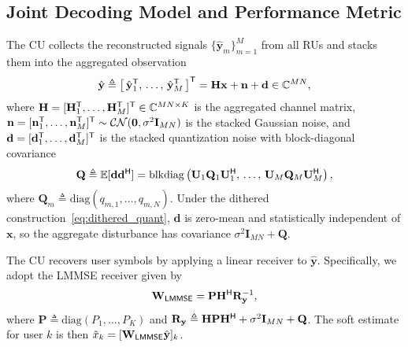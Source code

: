 \documentclass[10pt, twocolumn, comsoc]{IEEEtran}
\begin{document}
\subsection{Joint Decoding Model and Performance Metric}\label{subsec:joint_decoding}
The CU collects the reconstructed signals $\{\hat{\mathbf{y}}_m\}_{m=1}^{M}$ from all RUs and stacks them into the aggregated observation
\begin{align} \label{eq:vmac}
  \hat{\mathbf{y}} 
  \triangleq \big[\, \hat{\mathbf{y}}_1^{\sf T},\, 
       \dots,\, \hat{\mathbf{y}}_M^{\sf T} \,\big]^{\sf T} 
  = \mathbf{H} \mathbf{x} + \mathbf{n} + \mathbf{d} 
  \in \mathbb{C}^{MN},
\end{align}
where $\mathbf{H} = [\mathbf{H}_1^{\sf T}, \dots, \mathbf{H}_M^{\sf T}]^{\sf T} \in \mathbb{C}^{MN \times K}$ is the aggregated channel matrix, $\mathbf{n} = [\mathbf{n}_1^{\sf T}, \dots, \mathbf{n}_M^{\sf T}]^{\sf T} \sim \mathcal{CN}(\mathbf{0}, \sigma^2 \mathbf{I}_{MN})$ is the stacked Gaussian noise, and $\mathbf{d} = [\mathbf{d}_1^{\sf T}, \dots, \mathbf{d}_M^{\sf T}]^{\sf T}$ is the stacked quantization noise with block-diagonal covariance
\begin{align} \label{eq:Q_cov}
  \mathbf{Q} 
  \triangleq \mathbb{E}[\mathbf{d} \mathbf{d}^{\sf H}] 
  = \mathrm{blkdiag}\left(
       \mathbf{U}_1 \mathbf{Q}_1 \mathbf{U}_1^{\sf H},\, 
       \dots,\, 
       \mathbf{U}_M \mathbf{Q}_M \mathbf{U}_M^{\sf H}
     \right),
\end{align}
where $\mathbf{Q}_m \triangleq \mathrm{diag}(q_{m,1}, \dots, q_{m,N})$. Under the dithered construction~\eqref{eq:dithered_quant}, $\mathbf{d}$ is zero-mean and statistically independent of $\mathbf{x}$, so the aggregate disturbance has covariance $\sigma^2\mathbf{I}_{MN}+\mathbf{Q}$.

The CU recovers user symbols by applying a linear receiver to $\hat{\mathbf{y}}$.
Specifically, we adopt the LMMSE receiver given by
\begin{align} \label{eq:lmmse}
  \mathbf{W}_{\sf LMMSE} 
  = \mathbf{P} \mathbf{H}^{\sf H} \mathbf{R}_{\mathbf{y}}^{-1},
\end{align}
where $\mathbf{P} \triangleq \mathrm{diag}(P_1, \dots, P_K)$ and $\mathbf{R}_{\mathbf{y}} \triangleq \mathbf{H} \mathbf{P} \mathbf{H}^{\sf H} + \sigma^2 \mathbf{I}_{MN} + \mathbf{Q}$. 
The soft estimate for user $k$ is then $\tilde{x}_k = [\mathbf{W}_{\sf LMMSE} \hat{\mathbf{y}}]_k$.
\end{document}
